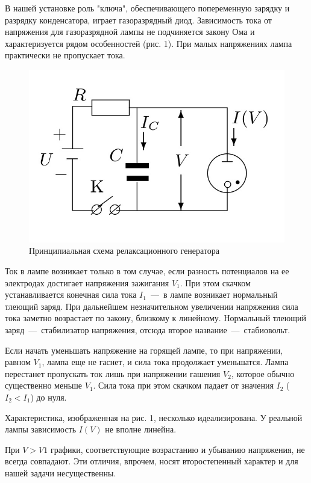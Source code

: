 \documentclass[a4paper, 12pt]{article}
\begin{document}
    В нашей установке роль "ключа", обеспечивающего попеременную зарядку и разрядку конденсатора, играет газоразрядный диод. 
    Зависимость тока от напряжения для газоразрядной лампы не подчиняется закону Ома и характеризуется рядом особенностей (рис. 1).
    При малых напряжениях лампа практически не пропускает тока. 

    \begin{figure}
        \includegraphics[scale=0.2]{pic2.jpg}
        \caption{Принципиальная схема релаксационного генератора}
    \end{figure}

    Ток в лампе возникает только в том случае, если разность потенциалов на ее электродах достигает напряжения зажигания $V_1$.
    При этом скачком устанавливается конечная сила тока $I_1$~---~в лампе возникает нормальный тлеющий заряд. 
    При дальнейшем незначительном увеличении напряжения сила тока заметно возрастает по закону, близкому к линейному.
    Нормальный тлеющий заряд~---~стабилизатор напряжения, отсюда второе название~---~стабиовольт.

    Если начать уменьшать напряжение на горящей лампе, то при напряжении, равном $V_1$, лампа еще не гаснет, и сила тока продолжает уменьшатся. 
    Лампа перестанет пропускать ток лишь при напряжении гашения $V_2$, которое обычно существенно меньше $V_1$.
    Сила тока при этом скачком падает от значения $I_2$ ($I_2 < I_1$) до нуля.

    Характеристика, изображенная на рис. 1, несколько идеализирована. 
    У реальной лампы зависимость $I\left(V\right)$ не вполне линейна.

    При $V > V1$ графики, соответствующие возрастанию и убыванию напряжения, не всегда совпадают. 
    Эти отличия, впрочем, носят второстепенный характер и для нашей задачи несущественны.
\end{document}
